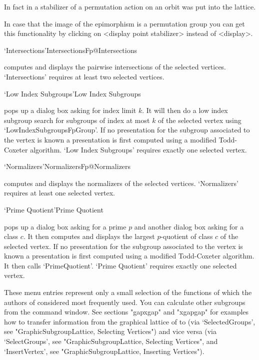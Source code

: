 In fact in {} a stabilizer of a permutation action on an orbit was
put into the lattice.

In case that the image of the epimorphism is a permutation group you can
get this functionality by clicking on <display point stabilizer> instead of 
<display>. 

\>`Intersections'{IntersectionsFp}@{Intersections}

computes and   displays   the pairwise   intersections  of  the  selected
vertices.  `Intersections' requires at least two selected vertices.

\>`Low Index Subgroups'{Low Index Subgroups}

pops up a dialog box asking for index  limit $k$.  It  will then do a low
index subgroup search for  subgroups of index at  most $k$ of the selected
vertex using `LowIndexSubgroupsFpGroup'.    If no  presentation  for  the
subgroup   associated to  the vertex  is  known a  presentation  is first
computed using a  modified  Todd-Coxeter algorithm. `Low Index Subgroups'
requires  exactly one selected vertex.

\>`Normalizers'{NormalizersFp}@{Normalizers}

computes and displays the normalizers of the selected vertices.
`Normalizers' requires at least one selected vertex.

\>`Prime Quotient'{Prime Quotient}

pops up a dialog box asking for a prime $p$ and another dialog box asking
for a class $c$.  It then  computes and displays the largest $p$-quotient
of class $c$ of the selected vertex.  If no presentation for the subgroup
associated to the vertex is known a  presentation is first computed using
a   modified  Todd-Coxeter algorithm.   It    then calls `PrimeQuotient'.
`Prime Quotient' requires exactly one selected vertex.

\bigskip

These menu entries represent only a small selection of the functions of
{\GAP} which the authors of {\XGAP} considered most frequently used. You
can calculate other subgroups from
the {\GAP} command window. See sections "gapxgap" and
"xgapgap" for examples how to transfer information from the graphical
lattice of {\XGAP} to {\GAP} (via `SelectedGroups', see
"GraphicSubgroupLattice, Selecting Vertices") and vice versa (via
`SelectGroups', see "GraphicSubgroupLattice, Selecting Vertices", and
`InsertVertex', see "GraphicSubgroupLattice, Inserting Vertices").



